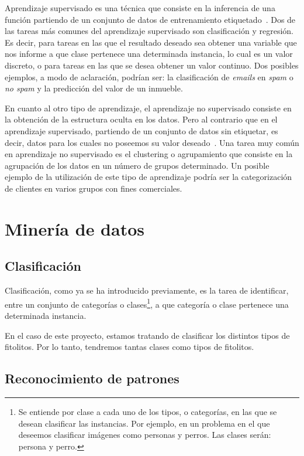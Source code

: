 Aprendizaje supervisado es una técnica que consiste en la inferencia de una función partiendo de un conjunto de datos de entrenamiento etiquetado~\cite{wiki:supervisedLearning}. Dos de las tareas más comunes del aprendizaje supervisado son clasificación y regresión. Es decir, para tareas en las que el resultado deseado sea obtener una variable que nos informe a que clase pertenece una determinada instancia, lo cual es un valor discreto, o para tareas en las que se desea obtener un valor continuo. Dos posibles ejemplos, a modo de aclaración,  podrían ser: la clasificación de \textit{emails} en \textit{spam} o \textit{no spam} y la predicción del valor de un inmueble.

En cuanto al otro tipo de aprendizaje, el aprendizaje no supervisado consiste en la obtención de la estructura oculta en los datos. Pero al contrario que en el aprendizaje supervisado, partiendo de un conjunto de datos sin etiquetar, es decir, datos para los cuales no poseemos su valor deseado~\cite{wiki:unsupervisedLearning}. Una tarea muy común en aprendizaje no supervisado es el clustering o agrupamiento que consiste en la agrupación de los datos en un número de grupos determinado. Un posible ejemplo  de la utilización de este tipo de aprendizaje podría ser la categorización de clientes en varios grupos con fines comerciales.

\section{Minería de datos}

\subsection{Clasificación}

Clasificación, como ya se ha introducido previamente, es la tarea de identificar, entre un conjunto de  categorías o clases\footnote{Se entiende por clase a cada uno de los tipos, o categorías, en las que se desean clasificar las instancias. Por ejemplo, en un problema en el que deseemos clasificar imágenes como personas y perros. Las clases serán: persona y perro.}, a que categoría o clase pertenece una determinada instancia.

En el caso de este proyecto, estamos tratando de clasificar los distintos tipos de fitolitos. Por lo tanto, tendremos tantas clases como tipos de fitolitos.

\subsection{Reconocimiento de patrones}

